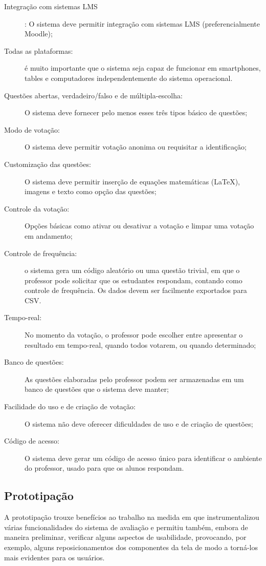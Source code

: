 \begin{description}
\item[Integração com sistemas LMS]: O sistema deve permitir integração com
sistemas LMS (preferencialmente Moodle);
\item[Todas as plataformas:] é muito importante que o sistema seja capaz
de funcionar em smartphones, tables e computadores independentemente
do sistema operacional.
\item[Questões abertas, verdadeiro/falso e de múltipla-escolha:] O sistema
deve fornecer pelo menos esses três tipos básico de questões;
\item[Modo de votação:] O sistema deve permitir votação anonima ou requisitar
a identificação;
\item[Customização das questões:] O sistema deve permitir inserção de equações
matemáticas (\LaTeX), imagens e texto como opção das questões;
\item[Controle da votação:] Opções básicas como ativar ou desativar a votação
e limpar uma votação em andamento;
\item[Controle de frequência:] o sistema gera um código aleatório ou uma
questão trivial, em que o professor pode solicitar que os estudantes
respondam, contando como controle de frequência. Os dados devem ser
facilmente exportados para CSV.
\item[Tempo-real:] No momento da votação, o professor pode escolher entre
apresentar o resultado em tempo-real, quando todos votarem, ou quando
determinado;
\item[Banco de questões:] As questões elaboradas pelo professor podem ser
armazenadas em um banco de questões que o sistema deve manter;
\item[Facilidade do uso e de criação de votação:] O sistema não deve oferecer
dificuldades de uso e de criação de questões;
\item[Código de acesso:] O sistema deve gerar um código de acesso único para
identificar o ambiente do professor, usado para que os alunos respondam.
\end{description}








\subsection{Prototipação}

A prototipação trouxe benefícios ao trabalho na medida em que instrumentalizou várias
funcionalidades do sistema de avaliação e permitiu também, embora de maneira
preliminar, verificar alguns aspectos de usabilidade, provocando, por exemplo, alguns
reposicionamentos dos componentes da tela de modo a torná-los mais evidentes para os
usuários.
